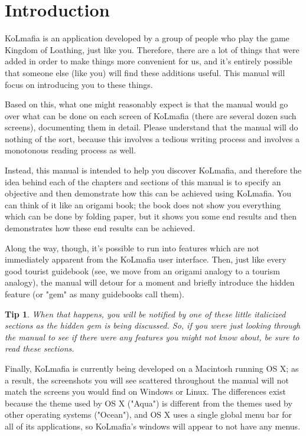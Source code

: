 \documentclass[twocolumn,letterpaper]{report}
\newtheorem{tip}{Tip}[section]
\begin{document}
\section{Introduction}

KoLmafia is an application developed by a group of people who play the game Kingdom of Loathing, just like you.  Therefore, there are a lot of things that were added in order to make things more convenient for us, and it's entirely possible that someone else (like you) will find these additions useful.  This manual will focus on introducing you to these things.

Based on this, what one might reasonably expect is that the manual would go over what can be done on each screen of KoLmafia (there are several dozen such screens), documenting them in detail.  Please understand that the manual will do nothing of the sort, because this involves a tedious writing process and involves a monotonous reading process as well.

Instead, this manual is intended to help you discover KoLmafia, and therefore the idea behind each of the chapters and sections of this manual is to specify an objective and then demonstrate how this can be achieved using KoLmafia.  You can think of it like an origami book; the book does not show you everything which can be done by folding paper, but it shows you some end results and then demonstrates how these end results can be achieved.

Along the way, though, it's possible to run into features which are not immediately apparent from the KoLmafia user interface.  Then, just like every good tourist guidebook (see, we move from an origami analogy to a tourism analogy), the manual will detour for a moment and briefly introduce the hidden feature (or "gem" as many guidebooks call them).

\begin{tip}
When that happens, you will be notified by one of these little italicized sections as the hidden gem is being discussed.  So, if you were just looking through the manual to see if there were any features you might not know about, be sure to read these sections.
\end{tip}

Finally, KoLmafia is currently being developed on a Macintosh running OS X; as a result, the screenshots you will see scattered throughout the manual will not match the screens you would find on Windows or Linux.  The differences exist because the theme used by OS X ("Aqua") is different from the themes used by other operating systems ("Ocean"), and OS X uses a single global menu bar for all of its applications, so KoLmafia's windows will appear to not have any menus.
\end{document}
